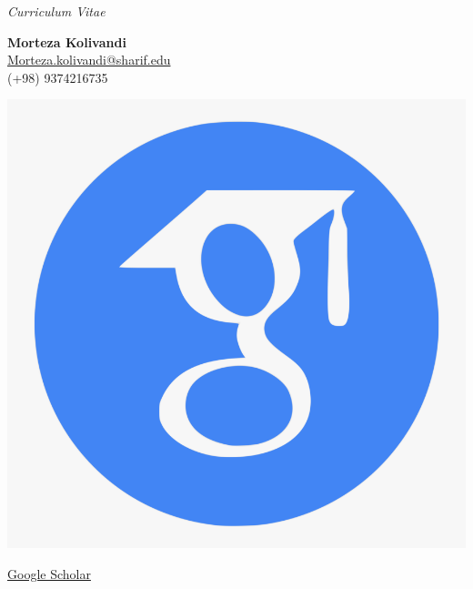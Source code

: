 \documentclass[letter,20pt]{article}
\begin{document}
\begin{center}
  \textit{\Large Curriculum Vitae}
\end{center}

\vspace{10pt} %

\noindent
\begin{minipage}[t]{0.45\textwidth}
  \textbf{\large Morteza Kolivandi}\\[7.5pt]
  \url{Morteza.kolivandi@sharif.edu}\\[7.5pt]
  (+98) 9374216735
\end{minipage}%
\hfill
\begin{minipage}[t]{0.45\textwidth}
  \raggedleft
  \parbox{0.5cm}{\includegraphics[scale=0.015]{GS}}
  \parbox{3cm}{\href{https://scholar.google.com/citations?user=FICYUZIAAAAJ&hl=en&authuser=1}{Google Scholar}}\par

\end{minipage}
\end{document}
